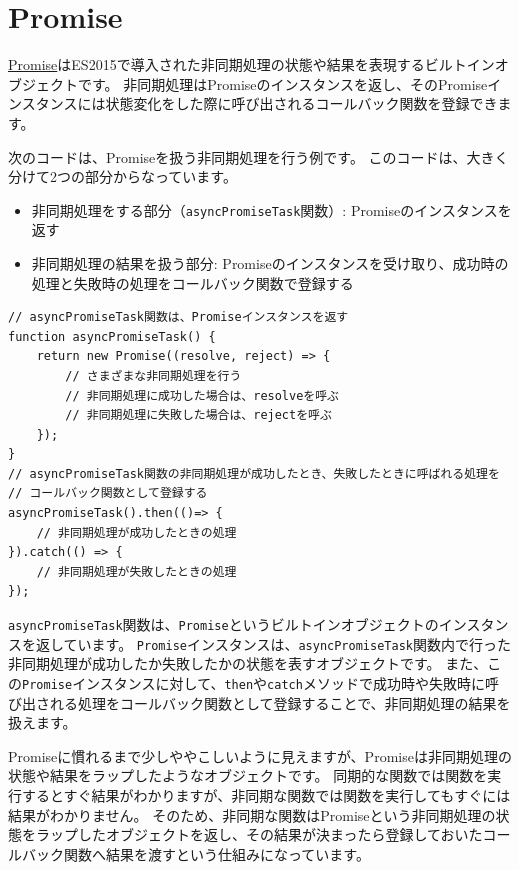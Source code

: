 \hypertarget{promise}{%
\section[Promise]{Promise\,\protect{}}\label{promise}}

\href{https://developer.mozilla.org/ja/docs/Web/JavaScript/Reference/Global_Objects/Promise}{Promise}はES2015で導入された非同期処理の状態や結果を表現するビルトインオブジェクトです。
非同期処理はPromiseのインスタンスを返し、そのPromiseインスタンスには状態変化をした際に呼び出されるコールバック関数を登録できます。

次のコードは、Promiseを扱う非同期処理を行う例です。
このコードは、大きく分けて2つの部分からなっています。

\begin{itemize}
\item
  非同期処理をする部分（\texttt{asyncPromiseTask}関数）: Promiseのインスタンスを返す
\item
  非同期処理の結果を扱う部分: Promiseのインスタンスを受け取り、成功時の処理と失敗時の処理をコールバック関数で登録する
\end{itemize}

\begin{lstlisting}
// asyncPromiseTask関数は、Promiseインスタンスを返す
function asyncPromiseTask() {
    return new Promise((resolve, reject) => {
        // さまざまな非同期処理を行う
        // 非同期処理に成功した場合は、resolveを呼ぶ
        // 非同期処理に失敗した場合は、rejectを呼ぶ
    });
}
// asyncPromiseTask関数の非同期処理が成功したとき、失敗したときに呼ばれる処理を
// コールバック関数として登録する
asyncPromiseTask().then(()=> {
    // 非同期処理が成功したときの処理
}).catch(() => {
    // 非同期処理が失敗したときの処理
});
\end{lstlisting}

\texttt{asyncPromiseTask}関数は、\texttt{Promise}というビルトインオブジェクトのインスタンスを返しています。
\texttt{Promise}インスタンスは、\texttt{asyncPromiseTask}関数内で行った非同期処理が成功したか失敗したかの状態を表すオブジェクトです。
 また、この\texttt{Promise}インスタンスに対して、\texttt{then}や\texttt{catch}メソッドで成功時や失敗時に呼び出される処理をコールバック関数として登録することで、非同期処理の結果を扱えます。

Promiseに慣れるまで少しややこしいように見えますが、Promiseは非同期処理の状態や結果をラップしたようなオブジェクトです。
同期的な関数では関数を実行するとすぐ結果がわかりますが、非同期な関数では関数を実行してもすぐには結果がわかりません。
そのため、非同期な関数はPromiseという非同期処理の状態をラップしたオブジェクトを返し、その結果が決まったら登録しておいたコールバック関数へ結果を渡すという仕組みになっています。

